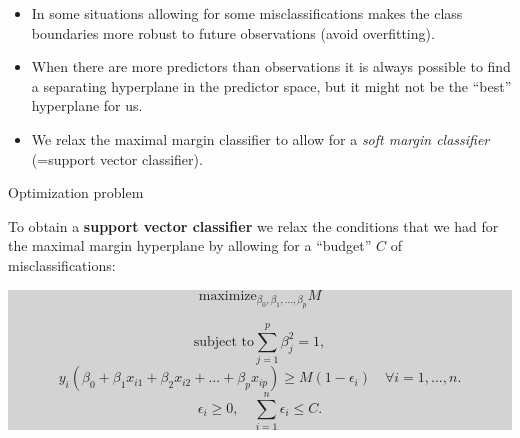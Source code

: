 \documentclass[10pt,ignorenonframetext,]{beamer}
\begin{document}
\begin{frame}

\begin{itemize}
\item
  In some situations allowing for some misclassifications makes the
  class boundaries more robust to future observations (avoid
  overfitting).
\item
  When there are more predictors than observations it is always possible
  to find a separating hyperplane in the predictor space, but it might
  not be the ``best'' hyperplane for us.
\item
  We relax the maximal margin classifier to allow for a \emph{soft
  margin classifier} (=support vector classifier).
\end{itemize}

\end{frame}

\begin{frame}

\begin{block}{Optimization problem}

\vspace{2mm}

To obtain a \textbf{support vector classifier} we relax the conditions
that we had for the maximal margin hyperplane by allowing for a
``budget'' \(C\) of misclassifications: \vspace{2mm}

\colorbox{lightgray}{\begin{minipage}{10cm}
$$\mathrm{maximize}_{\beta_0,\beta_1,...,\beta_p}  M $$

$$\text{subject to} \sum_{j=1}^p \beta_j^2=1,$$
$$y_i(\beta_0+\beta_1 x_{i1}+\beta_2 x_{i2}+...+\beta_p x_{ip})\geq M(1-\epsilon_i) \quad  \forall i=1,...,n.$$
$$\epsilon_i\geq 0, \quad \sum_{i=1}^n \epsilon_i \leq C.$$
\end{minipage}}

\end{block}

\end{frame}
\end{document}
